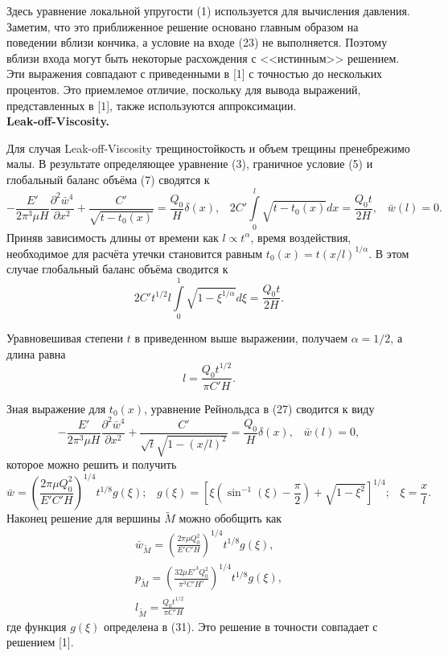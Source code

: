 \documentclass[a4paper, 12pt]{article}
\newcommand{\beq}{\begin{equation}}
\newcommand{\eeq}{\end{equation}}
\begin{document}
Здесь уравнение локальной упругости (1) используется для вычисления давления.
Заметим, что это приближенное решение основано главным образом на поведении вблизи кончика, а условие на входе (23) не выполняется.
Поэтому вблизи входа могут быть некоторые расхождения с <<истинным>> решением.
Эти выражения совпадают с приведенными в [1] с точностью до нескольких процентов. Это приемлемое отличие, поскольку для вывода выражений, представленных в [1], также используются аппроксимации.\\

\textbf{Leak-off-Viscosity.}

Для случая Leak-off-Viscosity трещиностойкость и объем трещины пренебрежимо малы.
В результате определяющее уравнение (3), граничное условие (5) и глобальный баланс объёма (7) сводятся к
\beq
-\frac{E'}{2\pi^3\mu H}\frac{\partial^2\bar{w}^4}{\partial x^2}+\frac{C'}{\sqrt{t-t_0(x)}}=\frac{Q_0}{H}\delta(x),\,\,\,\,\,
2C'\int\limits_0^l\sqrt{t-t_0(x)}dx=\frac{Q_0t}{2H},\,\,\,\,\,
\bar{w}(l)=0.
\eeq
Приняв зависимость длины от времени как $l\propto t^{\alpha}$, время воздействия, необходимое для расчёта утечки становится равным $t_0(x)=t(x/l)^{1/\alpha}$.
В этом случае глобальный баланс объёма сводится к
\beq
2C't^{1/2}l\int\limits_0^1\sqrt{1-\xi^{1/\alpha}}d\xi=\frac{Q_0t}{2H}.
\eeq

Уравновешивая степени $t$ в приведенном выше выражении, получаем $\alpha=1/2$, а длина равна
\beq
l=\frac{Q_0t^{1/2}}{\pi C'H}.
\eeq

Зная выражение для $t_0(x)$, уравнение Рейнольдса в (27) сводится к виду
\beq
-\frac{E'}{2\pi^3\mu H}\frac{\partial^2\bar{w}^4}{\partial x^2}+\frac{C'}{\sqrt{t}\sqrt{1-(x/l)^2}}=\frac{Q_0}{H}\delta(x),\,\,\,\,\,
\bar{w}(l)=0,
\eeq
которое можно решить и получить
\beq
\bar{w}=\left(\frac{2\pi\mu Q_0^2}{E'C'H}\right)^{1/4}t^{1/8}g(\xi);\,\,\,\,\,
g(\xi)=\left[\xi\left(\sin^{-1}{\left(\xi\right)}-\frac{\pi}{2}\right)+\sqrt{1-\xi^2}\right]^{1/4};\,\,\,\,\,
\xi=\frac{x}{l}.
\eeq
Наконец решение для вершины $\tilde{M}$ можно обобщить как
\beq
\begin{gathered}
\bar{w}_{\tilde{M}}=\left(\frac{2\pi\mu Q_0^2}{E'C'H}\right)^{1/4}t^{1/8}g(\xi),\\
p_{\tilde{M}}=\left(\frac{32\mu E'^3Q_0^2}{\pi^3C'H^5}\right)^{1/4}t^{1/8}g(\xi),\\
l_{\tilde{M}}=\frac{Q_0t^{1/2}}{\pi C'H}
\end{gathered}
\eeq
где функция $g(\xi)$ определена в (31).
Это решение в точности совпадает с решением [1].
\end{document}
